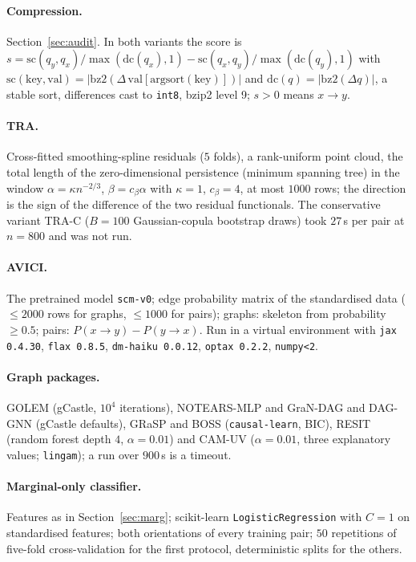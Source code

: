 \paragraph{Compression.} Section~\ref{sec:audit}. In both variants the score is $s=\mathrm{sc}(q_y,q_x)/\max(\mathrm{dc}(q_x),1)-\mathrm{sc}(q_x,q_y)/\max(\mathrm{dc}(q_y),1)$ with $\mathrm{sc}(\mathrm{key},\mathrm{val})=|\mathrm{bz2}(\Delta\,\mathrm{val}[\mathrm{argsort}(\mathrm{key})])|$ and $\mathrm{dc}(q)=|\mathrm{bz2}(\Delta q)|$, a stable sort, differences cast to \texttt{int8}, bzip2 level 9; $s>0$ means $x\to y$.
\paragraph{TRA.} Cross-fitted smoothing-spline residuals ($5$ folds), a rank-uniform point cloud, the total length of the zero-dimensional persistence (minimum spanning tree) in the window $\alpha=\kappa n^{-2/3}$, $\beta=c_\beta\alpha$ with $\kappa=1$, $c_\beta=4$, at most $1000$ rows; the direction is the sign of the difference of the two residual functionals. The conservative variant TRA-C ($B=100$ Gaussian-copula bootstrap draws) took $27$\,s per pair at $n=800$ and was not run.
\paragraph{AVICI.} The pretrained model \texttt{scm-v0}; edge probability matrix of the standardised data ($\le 2000$ rows for graphs, $\le 1000$ for pairs); graphs: skeleton from probability $\ge 0.5$; pairs: $P(x\to y)-P(y\to x)$. Run in a virtual environment with \texttt{jax 0.4.30}, \texttt{flax 0.8.5}, \texttt{dm-haiku 0.0.12}, \texttt{optax 0.2.2}, \texttt{numpy<2}.
\paragraph{Graph packages.} GOLEM (gCastle, $10^4$ iterations), NOTEARS-MLP and GraN-DAG and DAG-GNN (gCastle defaults), GRaSP and BOSS (\texttt{causal-learn}, BIC), RESIT (random forest depth $4$, $\alpha=0.01$) and CAM-UV ($\alpha=0.01$, three explanatory values; \texttt{lingam}); a run over $900$\,s is a timeout.
\paragraph{Marginal-only classifier.} Features as in Section~\ref{sec:marg}; scikit-learn \texttt{LogisticRegression} with $C=1$ on standardised features; both orientations of every training pair; $50$ repetitions of five-fold cross-validation for the first protocol, deterministic splits for the others.
